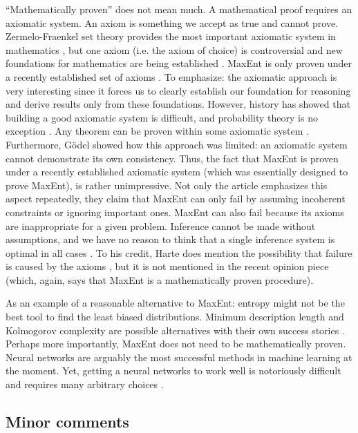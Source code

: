 \documentclass[letterpaper,12pt]{article}
\begin{document}
``Mathematically proven'' does not mean much. A mathematical proof requires
an axiomatic system. An axiom is something we accept as true and cannot
prove. Zermelo-Fraenkel set theory provides the most important axiomatic
system in mathematics \cite{and94}, but one axiom (i.e. the axiom of choice)
is controversial \cite {pen05} and new foundations for mathematics are being
established \cite {bar05,awo11,ufp13}. MaxEnt is only proven under a
recently established set of axioms \cite {har11}. To emphasize: the
axiomatic approach is very interesting since it forces us to clearly
establish our foundation for reasoning and derive results only from these
foundations. However, history has showed that building a good axiomatic
system is difficult, and probability theory is no exception \cite
{cox46,mac03,gha05}. Any theorem can be proven within some axiomatic system
\cite{and94}. Furthermore, G\"odel \cite{god62} showed how this approach was
limited: an axiomatic system cannot demonstrate its own consistency. Thus,
the fact that MaxEnt is proven under a recently established axiomatic system
(which was essentially designed to prove MaxEnt), is rather unimpressive.
Not only the article emphasizes this aspect repeatedly, they claim that
MaxEnt can only fail by assuming incoherent constraints or ignoring
important ones. MaxEnt can also fail because its axioms are inappropriate
for a given problem. Inference cannot be made without assumptions, and we
have no reason to think that a single inference system is optimal in all
cases \cite{mac03}. To his credit, Harte does mention the possibility that
failure is caused by the axioms \cite [p. 130] {har11}, but it is not
mentioned in the recent opinion piece \cite {har14} (which, again, says that
MaxEnt is a mathematically proven procedure).

As an example of a reasonable alternative to MaxEnt: entropy might not be
the best tool to find the least biased distributions. Minimum description
length and Kolmogorov complexity are possible alternatives with their own
success stories \cite {kol65,gru03,li_08,mit09,yua13}. Perhaps more
importantly, MaxEnt does not need to be mathematically proven. Neural
networks are arguably the most successful methods in machine learning at the
moment. Yet, getting a neural networks to work well is notoriously difficult
and requires many arbitrary choices \cite{hin06}.

\subsection{Minor comments}
\end{document}

